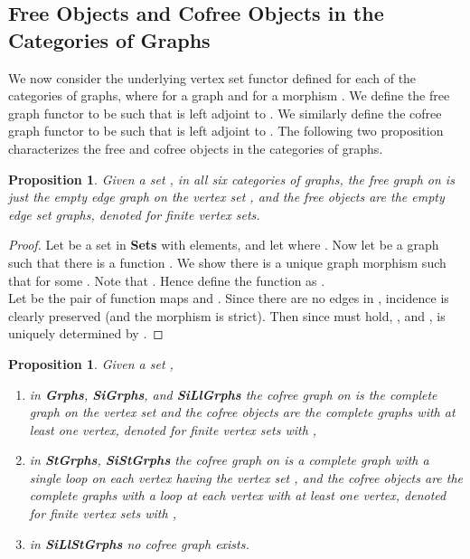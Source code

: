 \documentclass[11pt]{article}
\newtheorem{proposition}[theorem]{Proposition}
\begin{document}
\subsection{Free Objects and Cofree Objects in the Categories of Graphs}
\indent We now consider the underlying vertex set functor  defined for each of the categories of graphs, where   for a graph  and  for a morphism . We define the free graph functor  to be such that  is left adjoint to . We similarly define the cofree graph functor  to be such that  is left adjoint to . The following two proposition characterizes the free and cofree objects in the categories of graphs.
\begin{proposition}
Given a set , in all six categories of graphs, the free graph on  is just the empty edge graph on the vertex set , and the free objects are the empty edge set graphs, denoted  for finite vertex sets.
\end{proposition}
\begin{proof}
Let  be a set in \textbf{Sets} with  elements, and let  where . Now let  be a graph such that there is a function . We show there is a unique graph morphism  such that  for some . Note that . Hence define the function  as .\\
\indent Let  be the pair of function maps  and . Since there are no edges in , incidence is clearly preserved (and the morphism is strict). Then since  must hold, , and ,  is uniquely determined by . 
\end{proof}
\begin{proposition}
Given a set ,
\begin{enumerate}
\item in \textbf{Grphs},  \textbf{SiGrphs}, and  \textbf{SiLlGrphs} the cofree graph on  is the complete graph on the vertex set  and the cofree objects are the complete graphs with at least one vertex, denoted  for finite vertex sets with ,
\item in \textbf{StGrphs}, \textbf{SiStGrphs} the cofree graph on  is a complete graph with a single loop on each vertex having the vertex set , and the cofree objects are the complete graphs with a loop at each vertex with at least one vertex, denoted  for finite vertex sets with ,
\item in \textbf{SiLlStGrphs} no cofree graph exists. 
\end{enumerate}
\end{proposition}
\end{document}

